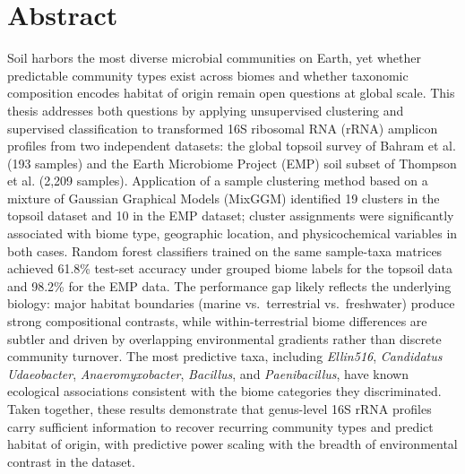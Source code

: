 \documentclass[12pt, oneside]{report}
\begin{document}
\chapter*{Abstract}

Soil harbors the most diverse microbial communities on Earth, yet whether predictable community types exist across biomes and whether taxonomic composition encodes habitat of origin remain open questions at global scale. This thesis addresses both questions by applying unsupervised clustering and supervised classification to transformed 16S ribosomal RNA (rRNA) amplicon profiles from two independent datasets: the global topsoil survey of Bahram et al.\cite{bahram2018} (193 samples) and the Earth Microbiome Project (EMP) soil subset of Thompson et al.\cite{thompson2017} (2,209 samples). Application of a sample clustering method based on a mixture of Gaussian Graphical Models (MixGGM) identified 19 clusters in the topsoil dataset and 10 in the EMP dataset; cluster assignments were significantly associated with biome type, geographic location, and physicochemical variables in both cases. Random forest classifiers trained on the same sample-taxa matrices achieved 61.8\% test-set accuracy under grouped biome labels for the topsoil data and 98.2\% for the EMP data. The performance gap likely reflects the underlying biology: major habitat boundaries (marine vs.\ terrestrial vs.\ freshwater) produce strong compositional contrasts, while within-terrestrial biome differences are subtler and driven by overlapping environmental gradients rather than discrete community turnover. The most predictive taxa, including \textit{Ellin516}, \textit{Candidatus Udaeobacter}, \textit{Anaeromyxobacter}, \textit{Bacillus}, and \textit{Paenibacillus}, have known ecological associations consistent with the biome categories they discriminated. Taken together, these results demonstrate that genus-level 16S rRNA profiles carry sufficient information to recover recurring community types and predict habitat of origin, with predictive power scaling with the breadth of environmental contrast in the dataset.

\newpage

\tableofcontents
\newpage

\listoffigures
{}
\newpage

\listoftables
{}
\newpage
\end{document}
